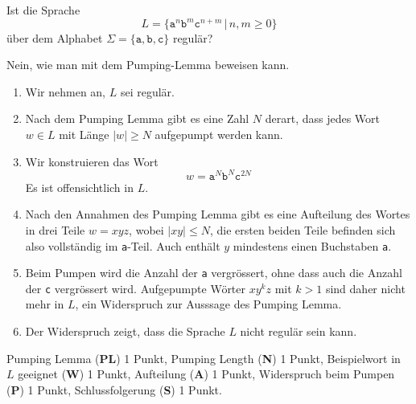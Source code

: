 Ist die Sprache
\[
L=\{ \texttt{a}^n\texttt{b}^m\texttt{c}^{n+m}\,|\,n,m\ge 0\}
\]
über dem Alphabet $\Sigma= \{\texttt{a},\texttt{b},\texttt{c}\}$
regulär?


\begin{loesung}
Nein, wie man mit dem Pumping-Lemma beweisen kann.
\begin{enumerate}
\item
Wir nehmen an, $L$ sei regulär.
\item
Nach dem Pumping Lemma gibt es eine Zahl $N$ derart, dass jedes
Wort $w\in L$ mit Länge $|w|\ge N$ aufgepumpt werden kann.
\item
Wir konstruieren das Wort
\[
w=\texttt{a}^N\texttt{b}^N\texttt{c}^{2N}
\]
Es ist offensichtlich in $L$.
\item
Nach den Annahmen des Pumping Lemma gibt es eine Aufteilung des
Wortes in drei Teile $w=xyz$, wobei $|xy|\le N$, die ersten beiden
Teile befinden sich also vollständig im \texttt{a}-Teil.
Auch enthält $y$ mindestens einen Buchstaben \texttt{a}.
\item
Beim Pumpen wird die Anzahl der \texttt{a} vergrössert, ohne dass auch
die Anzahl der \texttt{c} vergrössert wird.
Aufgepumpte Wörter $xy^kz$ mit $k>1$ sind daher nicht mehr in $L$,
ein Widerspruch zur Ausssage des Pumping Lemma.
\item 
Der Widerspruch zeigt, dass die Sprache $L$ nicht regulär sein kann.
\qedhere
\end{enumerate}
\end{loesung}

\begin{bewertung}
Pumping Lemma ({\bf PL}) 1 Punkt,
Pumping Length ({\bf N}) 1 Punkt,
Beispielwort in $L$ geeignet ({\bf W}) 1 Punkt,
Aufteilung ({\bf A}) 1 Punkt,
Widerspruch beim Pumpen ({\bf P}) 1 Punkt,
Schlussfolgerung ({\bf S}) 1 Punkt.
\end{bewertung}

